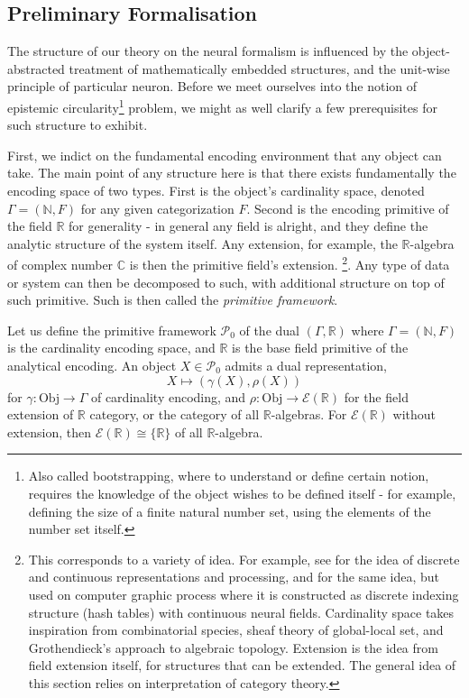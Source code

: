 \subsection{Preliminary Formalisation}

The structure of our theory on the neural formalism is influenced by the object-abstracted treatment of mathematically embedded structures, and the unit-wise principle of particular neuron. Before we meet ourselves into the notion of epistemic circularity\footnote{Also called bootstrapping, where to understand or define certain notion, requires the knowledge of the object wishes to be defined itself - for example, defining the size of a finite natural number set, using the elements of the number set itself.} problem, we might as well clarify a few prerequisites for such structure to exhibit. 

First, we indict on the fundamental encoding environment that any object can take. The main point of any structure here is that there exists fundamentally the encoding space of two types. First is the object's cardinality space, denoted $\Gamma=(\mathbb{N},F)$ for any given categorization $F$. Second is the encoding primitive of the field $\mathbb{R}$ for generality - in general any field is alright, and they define the analytic structure of the system itself. Any extension, for example, the $\mathbb{R}$-algebra of complex number $\mathbb{C}$ is then the primitive field's extension. \footnote{This corresponds to a variety of idea. For example, see \cite{Cartuyvels_2021} for the idea of discrete and continuous representations and processing, and \cite{M_ller_2022} for the same idea, but used on computer graphic process where it is constructed as discrete indexing structure (hash tables) with continuous neural fields. Cardinality space takes inspiration from combinatorial species, sheaf theory of global-local set, and Grothendieck's approach to algebraic topology. Extension is the idea from field extension itself, for structures that can be extended. The general idea of this section relies on interpretation of category theory.}. Any type of data or system can then be decomposed to such, with additional structure on top of such primitive. Such is then called the \textit{primitive framework}. 

\begin{definition}
    Let us define the primitive framework $\mathcal{P}_{0}$ of the dual $(\Gamma, \mathbb{R})$ where $\Gamma=(\mathbb{N},F)$ is the cardinality encoding space, and $\mathbb{R}$ is the base field primitive of the analytical encoding. An object $X\in \mathcal{P}_{0}$ admits a dual representation, 
    \begin{equation}
        X \mapsto (\gamma(X),\rho(X))
    \end{equation}
    for $\gamma: \mathrm{Obj}\to \Gamma$ of cardinality encoding, and $\rho:\mathrm{Obj}\to\mathcal{E}(\mathbb{R})$ for the field extension of $\mathbb{R}$ category, or the category of all $\mathbb{R}$-algebras. For $\mathcal{E}(\mathbb{R})$ without extension, then $\mathcal{E}(\mathbb{R})\cong \{\mathbb{R}\}$ of all $\mathbb{R}$-algebra. 
\end{definition}

